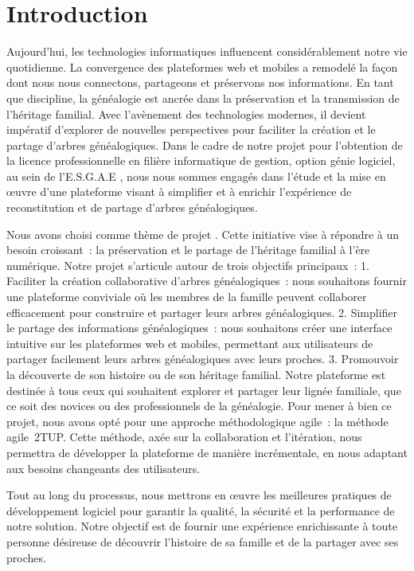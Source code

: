 \chapter*{Introduction}
Aujourd’hui, les technologies informatiques influencent considérablement notre
vie quotidienne. La convergence des plateformes web et mobiles a remodelé la
façon dont nous nous connectons, partageons et préservons nos informations.
En tant que discipline, la généalogie est ancrée dans la préservation et la
transmission de l’héritage familial. Avec l’avènement des technologies modernes,
il devient impératif d’explorer de nouvelles perspectives pour faciliter la
création et le partage d’arbres généalogiques. Dans le cadre de notre projet pour
l’obtention de la licence professionnelle en filière informatique de gestion,
option génie logiciel, au sein de l'\ac{E.S.G.A.E} , nous nous sommes engagés dans l’étude et la mise
en œuvre d’une plateforme visant à simplifier et à enrichir l’expérience de
reconstitution et de partage d’arbres généalogiques.

Nous avons choisi comme thème de projet \say{\projettheme}. Cette initiative vise à répondre à un besoin croissant : la préservation
et le partage de l’héritage familial à l’ère numérique.
Notre projet s’articule autour de trois objectifs principaux :
1. Faciliter la création collaborative d’arbres généalogiques : nous souhaitons
fournir une plateforme conviviale où les membres de la famille peuvent collaborer
efficacement pour construire et partager leurs arbres généalogiques.
2. Simplifier le partage des informations généalogiques : nous souhaitons créer
une interface intuitive sur les plateformes web et mobiles, permettant aux utilisateurs
de partager facilement leurs arbres généalogiques avec leurs proches.
3. Promouvoir la découverte de son histoire ou de son héritage familial.
Notre plateforme est destinée à tous ceux qui souhaitent explorer et partager
leur lignée familiale, que ce soit des novices ou des professionnels de la généalogie.
Pour mener à bien ce projet, nous avons opté pour une approche méthodologique agile :
la méthode agile \ac{2TUP}.
Cette méthode, axée sur la collaboration et l’itération, nous permettra de développer
la plateforme de manière incrémentale, en nous adaptant aux besoins changeants des utilisateurs.

Tout au long du processus, nous mettrons en œuvre les meilleures pratiques de
développement logiciel pour garantir la qualité, la sécurité et la performance
de notre solution. Notre objectif est de fournir une expérience enrichissante à
toute personne désireuse de découvrir l’histoire de sa famille et de la partager avec ses proches.
